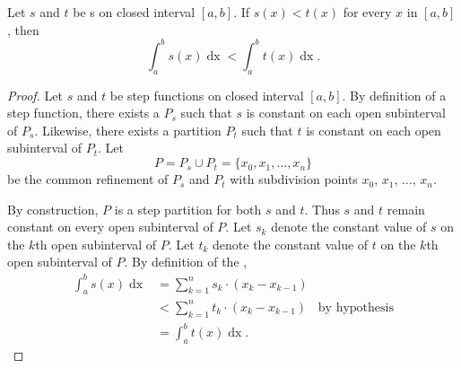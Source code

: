 \documentclass{report}
\begin{document}
\section{}%
\label{sec:step-comparison-theorem}
\label{sec:theorem-1.5}

\begin{theorem}[1.5]

  Let $s$ and $t$ be s on closed interval
    $[a, b]$.
  If $s(x) < t(x)$ for every $x$ in $[a, b]$, then
    $$\int_a^b s(x) \mathop{dx} < \int_a^b t(x) \mathop{dx}.$$

\end{theorem}

\begin{proof}

  Let $s$ and $t$ be step functions on closed interval $[a, b]$.
  By definition of a step function, there exists a 
    $P_s$ such that $s$ is constant on each open subinterval of $P_s$.
  Likewise, there exists a partition $P_t$ such that $t$ is constant on each
    open subinterval of $P_t$.
  Let $$P = P_s \cup P_t = \{x_0, x_1, \ldots, x_n\}$$ be the common refinement
    of $P_s$ and $P_t$ with subdivision points $x_0$, $x_1$, $\ldots$, $x_n$.

  By construction, $P$ is a step partition for both $s$ and $t$.
  Thus $s$ and $t$ remain constant on every open subinterval of $P$.
  Let $s_k$ denote the constant value of $s$ on the $k$th open subinterval of
    $P$.
  Let $t_k$ denote the constant value of $t$ on the $k$th open subinterval of
    $P$.
  By definition of the ,
    \begin{align*}
      \int_a^b s(x) \mathop{dx}
        & = \sum_{k=1}^n s_k \cdot (x_k - x_{k-1}) \\
        & < \sum_{k=1}^n t_k \cdot (x_k - x_{k-1}) & \text{by hypothesis} \\
        & = \int_a^b t(x) \mathop{dx}.
    \end{align*}

\end{proof}

\section{}%
\label{sec:step-additivity-with-respect-interval-integration}
\label{sec:theorem-1.6}
\end{document}
